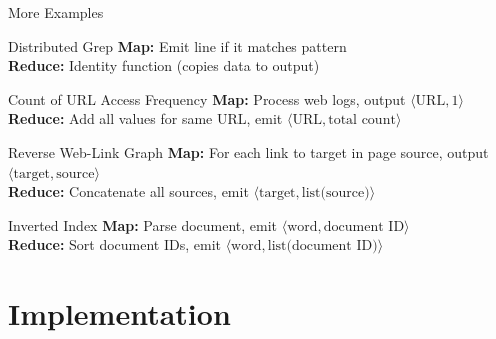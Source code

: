 \documentclass[aspectratio=169]{beamer}
\begin{document}
\begin{frame}{More Examples}
\begin{block}{Distributed Grep}
\textbf{Map:} Emit line if it matches pattern \\
\textbf{Reduce:} Identity function (copies data to output)
\end{block}

\begin{block}{Count of URL Access Frequency}
\textbf{Map:} Process web logs, output $\langle\text{URL}, 1\rangle$ \\
\textbf{Reduce:} Add all values for same URL, emit $\langle\text{URL}, \text{total count}\rangle$
\end{block}

\begin{block}{Reverse Web-Link Graph}
\textbf{Map:} For each link to target in page source, output $\langle\text{target}, \text{source}\rangle$ \\
\textbf{Reduce:} Concatenate all sources, emit $\langle\text{target}, \text{list(source)}\rangle$
\end{block}

\begin{block}{Inverted Index}
\textbf{Map:} Parse document, emit $\langle\text{word}, \text{document ID}\rangle$ \\
\textbf{Reduce:} Sort document IDs, emit $\langle\text{word}, \text{list(document ID)}\rangle$
\end{block}
\end{frame}

\section{Implementation}
\end{document}
